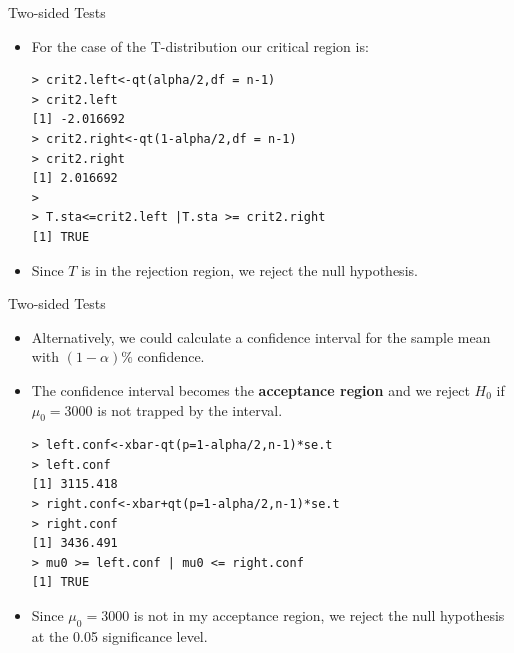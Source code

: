 \documentclass[handout]{beamer}
\begin{document}
\begin{frame}[fragile]{Two-sided Tests}
\scriptsize{
\begin{itemize}

\item For the case of the T-distribution our critical region is:
\begin{verbatim}
> crit2.left<-qt(alpha/2,df = n-1)
> crit2.left
[1] -2.016692
> crit2.right<-qt(1-alpha/2,df = n-1)
> crit2.right
[1] 2.016692
> 
> T.sta<=crit2.left |T.sta >= crit2.right
[1] TRUE
\end{verbatim}
\item Since $T$ is in the rejection region, we reject the null hypothesis.

\end{itemize}



} 
\end{frame}

\begin{frame}[fragile]{Two-sided Tests}
\scriptsize{
\begin{itemize}

\item Alternatively, we could calculate a confidence interval for the sample mean  with $(1-\alpha)\%$ confidence.

\item The confidence interval becomes the \textbf{acceptance region} and we reject $H_0$ if $\mu_0 =3000$ is not trapped by the interval.

\begin{verbatim}
> left.conf<-xbar-qt(p=1-alpha/2,n-1)*se.t
> left.conf
[1] 3115.418
> right.conf<-xbar+qt(p=1-alpha/2,n-1)*se.t
> right.conf
[1] 3436.491
> mu0 >= left.conf | mu0 <= right.conf
[1] TRUE
\end{verbatim}

\item Since  $\mu_0 =3000$ is not in my acceptance region, we reject the null hypothesis at the 0.05 significance level.

\end{itemize}



} 
\end{frame}
\end{document}
